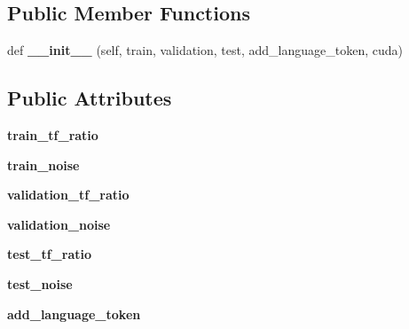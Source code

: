 \subsection*{Public Member Functions}
\begin{DoxyCompactItemize}
\item 
def {\bfseries \+\_\+\+\_\+init\+\_\+\+\_\+} (self, train, validation, test, add\+\_\+language\+\_\+token, cuda)\hypertarget{classutils_1_1UNMTPolicy_aa7771fd099101d3c163ee9eb789c7c66}{}\label{classutils_1_1UNMTPolicy_aa7771fd099101d3c163ee9eb789c7c66}

\end{DoxyCompactItemize}
\subsection*{Public Attributes}
\begin{DoxyCompactItemize}
\item 
{\bfseries train\+\_\+tf\+\_\+ratio}\hypertarget{classutils_1_1UNMTPolicy_af319b45c28de3ce3f89d7c909c1e6a24}{}\label{classutils_1_1UNMTPolicy_af319b45c28de3ce3f89d7c909c1e6a24}

\item 
{\bfseries train\+\_\+noise}\hypertarget{classutils_1_1UNMTPolicy_ac5ff7c811b3ac5271831caf38d371efb}{}\label{classutils_1_1UNMTPolicy_ac5ff7c811b3ac5271831caf38d371efb}

\item 
{\bfseries validation\+\_\+tf\+\_\+ratio}\hypertarget{classutils_1_1UNMTPolicy_abd56fc27231a1c32bb5faa79ff49b5e8}{}\label{classutils_1_1UNMTPolicy_abd56fc27231a1c32bb5faa79ff49b5e8}

\item 
{\bfseries validation\+\_\+noise}\hypertarget{classutils_1_1UNMTPolicy_a3ab4aec3b6603f62e06b371159017c21}{}\label{classutils_1_1UNMTPolicy_a3ab4aec3b6603f62e06b371159017c21}

\item 
{\bfseries test\+\_\+tf\+\_\+ratio}\hypertarget{classutils_1_1UNMTPolicy_a54444b59f860127d126830ecfb01c5dd}{}\label{classutils_1_1UNMTPolicy_a54444b59f860127d126830ecfb01c5dd}

\item 
{\bfseries test\+\_\+noise}\hypertarget{classutils_1_1UNMTPolicy_aa5d1c62dffce70284859cc89210cc728}{}\label{classutils_1_1UNMTPolicy_aa5d1c62dffce70284859cc89210cc728}

\item 
{\bfseries add\+\_\+language\+\_\+token}\hypertarget{classutils_1_1UNMTPolicy_a42030b477f0a58ff1369985a076197ab}{}\label{classutils_1_1UNMTPolicy_a42030b477f0a58ff1369985a076197ab}

\end{DoxyCompactItemize}
